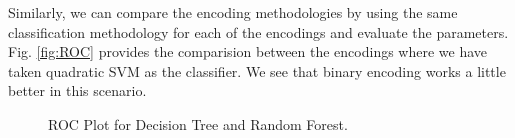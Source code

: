 \documentclass{article} %
\begin{document}
	Similarly, we can compare the encoding methodologies by using the same classification methodology for each of the encodings and evaluate the parameters. Fig. \ref{fig:ROC} provides the comparision between the encodings where we have taken quadratic SVM as the classifier. We see that binary encoding works a little better in this scenario.
	
	\begin{figure}[h]
		\begin{center}
		\end{center}
		
		\caption{ROC Plot for Decision Tree and Random Forest.}
		\label{fig:ROCProbBin}
	\end{figure}
	
\end{document}
